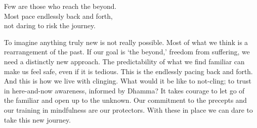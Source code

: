 

\begin{dhpVerse}{85}
\label{dhp-85}
Few are those who reach the beyond.\\
Most pace endlessly back and forth,\\
not daring to risk the journey.
\end{dhpVerse}

\begin{dhpRefl}
To imagine anything truly new is not really possible. Most of what we think is a rearrangement of the past. If our goal is `the beyond,' freedom from suffering, we need a distinctly new approach. The predictability of what we find familiar can make us feel safe, even if it is tedious. This is the endlessly pacing back and forth. And this is how we live with clinging. What would it be like to not-cling; to trust in here-and-now awareness, informed by Dhamma? It takes courage to let go of the familiar and open up to the unknown. Our commitment to the precepts and our training in mindfulness are our protectors. With these in place we can dare to take this new journey.
\end{dhpRefl}

